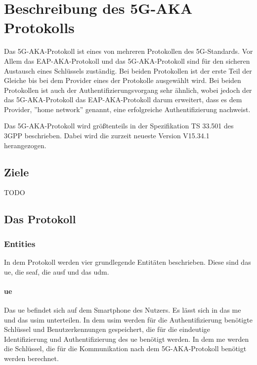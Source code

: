 \chapter{Beschreibung des 5G-AKA Protokolls}
\label{chap:2}

Das 5G-AKA-Protokoll ist eines von mehreren Protokollen des 5G-Standards.
Vor Allem das EAP-AKA-Protokoll und das 5G-AKA-Protokoll sind f\"ur den sicheren Austausch eines Schl\"ussels zust\"andig. 
Bei beiden Protokollen ist der erste Teil der Gleiche bis bei dem Provider eines der Protokolle ausgew\"ahlt wird. %
Bei beiden Protokollen ist auch der Authentifizierungsvorgang sehr \"ahnlich, wobei jedoch der das 5G-AKA-Protokoll das EAP-AKA-Protokoll darum erweitert, dass es dem Provider, ''home network'' genannt, eine erfolgreiche Authentifizierung nachweist. %

Das 5G-AKA-Protokoll wird gr\"o{\ss}tenteils in der Spezifikation TS 33.501 des 3GPP beschrieben. %
Dabei wird die zurzeit neueste Version V15.34.1 herangezogen.

\section{Ziele}

TODO

\section{Das Protokoll}

\subsection{Entities}

In dem Protokoll werden vier grundlegende Entit\"aten beschrieben.
Diese sind das \gls{ue}, die \gls{seaf}, die \gls{ausf} und das \gls{udm}.

\subsubsection{\gls{ue}}

Das \gls{ue} befindet sich auf dem Smartphone des Nutzers.
Es l\"asst sich in das \gls{me} und das \gls{usim} unterteilen.
In dem \gls{usim} werden f\"ur die Authentifizierung ben\"otigte Schl\"ussel und Benutzerkennungen gespeichert, die f\"ur die eindeutige Identifizierung und Authentifizierung des \gls{ue} ben\"otigt werden. %
In dem \gls{me} werden die Schl\"ussel, die f\"ur die Kommunikation nach dem 5G-AKA-Protokoll ben\"otigt werden berechnet.

